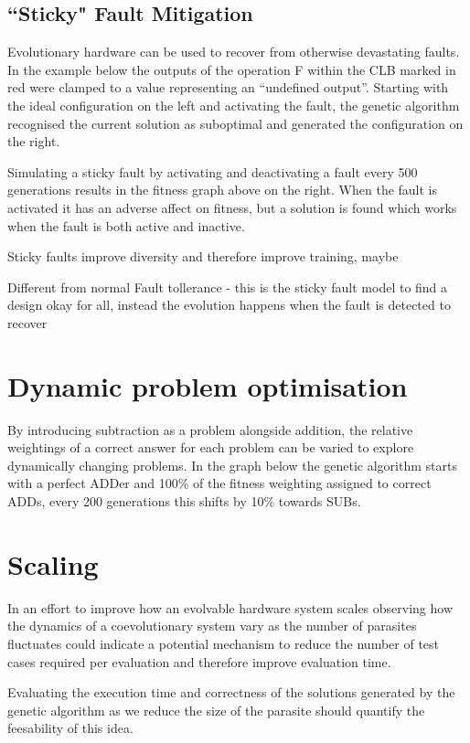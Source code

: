 \subsection{``Sticky" Fault Mitigation}
Evolutionary hardware can be used to recover from otherwise devastating faults. In the example below the outputs of the operation F within the CLB marked in red were clamped to a value representing an “undefined output”. Starting with the ideal configuration on the left and activating the fault, the genetic algorithm recognised the current solution as suboptimal and generated the configuration on the right.

Simulating a sticky fault by activating and deactivating a fault every 500 generations results in the fitness graph above on the right. When the fault is activated it has an adverse affect on fitness, but a solution is found which works when the fault is both active and inactive.

Sticky faults improve diversity and therefore improve training, maybe

Different from normal Fault tollerance - this is the sticky fault model to find a design okay for all, instead the evolution happens when the fault is detected to recover

\section{Dynamic problem optimisation}
By introducing subtraction as a problem alongside addition, the relative weightings of a correct answer for each problem can be varied to explore dynamically changing problems. In the graph below the genetic algorithm starts with a perfect ADDer and 100\% of the fitness weighting assigned to correct ADDs, every 200 generations this shifts by 10\% towards SUBs.

\section{Scaling}
In an effort to improve how an evolvable hardware system scales observing
how the dynamics of a coevolutionary system vary as the number of parasites
fluctuates could indicate a potential mechanism to reduce the number of
test cases required per evaluation and therefore improve evaluation time.

Evaluating the execution time and correctness of the solutions generated
by the genetic algorithm as we reduce the size of the parasite should
quantify the feesability of this idea.

